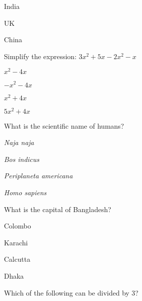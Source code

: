 \documentclass[12pt]{exam}
\begin{document}
\begin{questions}
\begin{oneparchoices}
            \choice India
        
            \choice UK
        
            \choice China
        
        \end{oneparchoices}

    \question Simplify the expression: $3x^2 + 5x - 2x^2 - x$
    
        \begin{oneparchoices}
        
            \choice $x^2 - 4x$
        
            \choice $-x^2 - 4x$
        
            \choice $x^2 + 4x$
        
            \choice $5x^2 + 4x$
        
        \end{oneparchoices}

    \question What is the scientific name of humans?
    
        \begin{oneparchoices}
        
            \choice \textit{Naja naja}
        
            \choice \textit{Bos indicus}
        
            \choice \textit{Periplaneta americana}
        
            \choice \textit{Homo sapiens}
        
        \end{oneparchoices}

    \question What is the capital of Bangladesh?
    
        \begin{oneparchoices}
        
            \choice Colombo
        
            \choice Karachi
        
            \choice Calcutta
        
            \choice Dhaka
        
        \end{oneparchoices}

    \question Which of the following can be divided by 3?
    
        \begin{oneparchoices}
        
        

\end{oneparchoices}
\end{questions}
\end{document}
